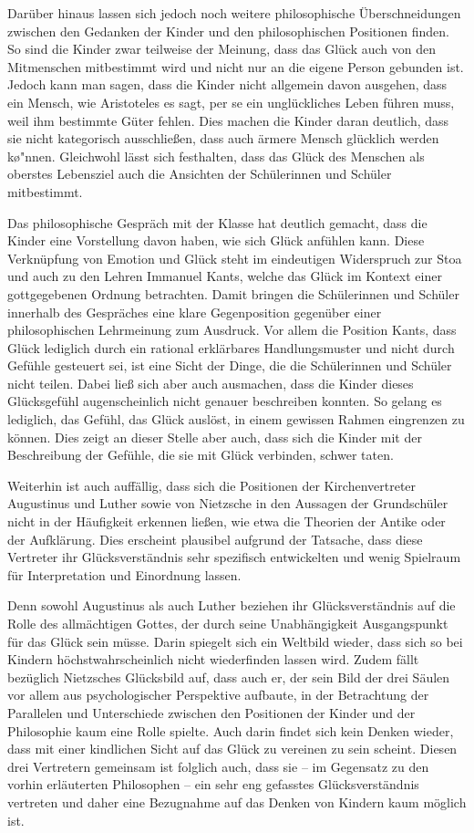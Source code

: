 Darüber hinaus lassen sich jedoch noch weitere philosophische Überschneidungen zwischen den Gedanken der Kinder und den philosophischen Positionen finden. 
So sind die Kinder zwar teilweise der Meinung, dass das Glück auch von den Mitmenschen mitbestimmt wird und nicht nur an die eigene Person gebunden ist. 
Jedoch kann man sagen, dass die Kinder nicht allgemein davon ausgehen, dass ein Mensch, wie Aristoteles es sagt, per se ein unglückliches Leben führen muss, weil ihm bestimmte Güter fehlen. 
Dies machen die Kinder daran deutlich, dass sie nicht kategorisch ausschließen, dass auch ärmere Mensch glücklich werden k\o"nnen.
Gleichwohl lässt sich festhalten, dass das Glück des Menschen als oberstes Lebensziel auch die Ansichten der Schülerinnen und Schüler mitbestimmt. 

Das philosophische Gespräch mit der Klasse hat deutlich gemacht, dass die Kinder eine Vorstellung davon haben, wie sich Glück anfühlen kann. 
Diese Verknüpfung von Emotion und Glück steht im eindeutigen Widerspruch zur Stoa und auch zu den Lehren Immanuel Kants, welche das Glück im Kontext einer gottgegebenen Ordnung betrachten.
Damit bringen die Schülerinnen und Schüler innerhalb des Gespräches  eine klare Gegenposition gegenüber einer philosophischen Lehrmeinung  zum Ausdruck. 
Vor allem die Position Kants, dass Glück lediglich durch ein rational erklärbares Handlungsmuster und nicht durch Gefühle gesteuert sei, ist eine Sicht der Dinge, die die Schülerinnen und Schüler nicht teilen. 
Dabei ließ sich aber auch ausmachen, dass die Kinder dieses Glücksgefühl augenscheinlich nicht genauer beschreiben konnten.
So gelang es lediglich, das Gefühl, das Glück auslöst, in einem gewissen Rahmen eingrenzen zu können.
Dies zeigt an dieser Stelle aber auch, dass sich die Kinder mit der Beschreibung der Gefühle, die sie mit Glück verbinden, schwer taten.

Weiterhin ist auch auffällig, dass sich die Positionen der Kirchenvertreter Augustinus und Luther sowie von Nietzsche in den Aussagen der Grundschüler nicht in der Häufigkeit erkennen ließen, wie etwa die Theorien der Antike oder der Aufklärung. 
Dies erscheint plausibel aufgrund der Tatsache, dass diese Vertreter ihr Glücksverständnis sehr spezifisch entwickelten und wenig Spielraum für Interpretation und Einordnung lassen. 

Denn sowohl Augustinus als auch Luther beziehen ihr Glücksverständnis auf die Rolle des allmächtigen Gottes, der durch seine Unabhängigkeit Ausgangspunkt für das Glück sein müsse. 
Darin spiegelt sich ein Weltbild wieder, dass sich so bei Kindern höchstwahrscheinlich nicht wiederfinden lassen wird. 
Zudem fällt bezüglich Nietzsches Glücksbild auf, dass auch er, der sein Bild der drei Säulen vor allem aus psychologischer Perspektive  aufbaute, in der Betrachtung der Parallelen und Unterschiede zwischen den Positionen der Kinder und der Philosophie kaum eine Rolle spielte. 
Auch darin findet sich kein Denken wieder, dass mit einer kindlichen Sicht auf das Glück zu vereinen zu sein scheint. 
Diesen drei Vertretern gemeinsam ist folglich auch, dass sie -- im Gegensatz zu den vorhin erläuterten Philosophen -- ein sehr eng gefasstes Glücksverständnis vertreten und daher eine Bezugnahme auf das Denken von Kindern kaum möglich ist. 

